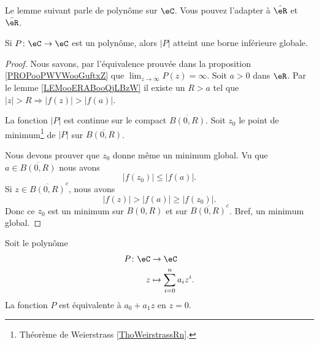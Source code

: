Le lemme suivant parle de polynôme sur \( \eC\). Vous pouvez l'adapter à \( \hat \eR\) et \( \bar \eR\).
\begin{lemma}       \label{LEMooYZVGooXZvBAc}
    Si \( P\colon \eC\to \eC\) est un polynôme, alors \( | P |\) atteint une borne inférieure globale.
\end{lemma}

\begin{proof}
    Nous savons, par l'équivalence prouvée dans la proposition \ref{PROPooPWVWooGuftxZ} que \( \lim_{z\to \infty} P(z)=\infty\). Soit \( a>0\) dans \( \eR\). Par le lemme \ref{LEMooERABooQjLBzW} il existe un \( R>a\) tel que \( | z |>R\Rightarrow | f(z) |>| f(a) |\).

    La fonction \( | P |\) est continue sur le compact \( \overline{ B(0,R) }\). Soit \( z_0\) le point de minimum\footnote{Théorème de Weierstrass \ref{ThoWeirstrassRn}.} de \( | P |\) sur \( \overline{ B(0,R) }\).

    Nous devons prouver que \( z_0\) donne même un minimum global. Vu que \( a\in\overline{ B(0,R) }\) nous avons
    \begin{equation}
        | f(z_0) |\leq | f(a) |.
    \end{equation}
    Si \( z\in \overline{ B(0,R) }^c\), nous avons
    \begin{equation}
        | f(z) |>| f(a) |\geq | f(z_0) |.
    \end{equation}
    Donc ce \( z_0\) est un minimum sur \( B(0,R)\) et sur \( \overline{ B(0,R) }^c\). Bref, un minimum global.
\end{proof}

\begin{lemma}       \label{LEMooTTOYooXaukuH}
    Soit le polynôme
    \begin{equation}
        \begin{aligned}
            P\colon \eC&\to \eC \\
            z&\mapsto \sum_{i=0}^na_iz^i. 
        \end{aligned}
    \end{equation}
    La fonction \( P\) est équivalente à \( a_0+a_1z\) en \( z=0\).
\end{lemma}

